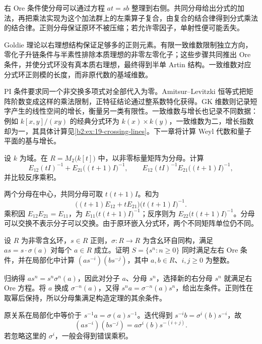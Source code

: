 




\begin{chaptersummary}
	右 Ore 条件使分母可以通过方程 \(at=sb\) 整理到右侧。共同分母给出分式的加法，再把乘法实现为这个加法群上的左乘算子复合，由复合的结合律得到分式乘法的结合律。正则分母保证原环不被压缩；若允许零因子，单射性便可能丢失。

	\ProseParagraphBreak
	Goldie 理论以右理想结构保证足够多的正则元素。有限一致维数限制独立方向，零化子升链条件与半素性排除本质理想的非零左零化子；这些步骤共同推出 Ore 条件，并使分式环没有真本质右理想，最终得到半单 Artin 结构。一致维数对应分式环正则模的长度，而非原代数的基域维数。

	\ProseParagraphBreak
	PI 条件要求同一个非交换多项式对全部代入为零。Amitsur–Levitzki 恒等式把矩阵阶数变成这样的乘法限制，正特征结论通过整系数特化获得。GK 维数则记录短字产生的线性空间的增长，衡量另一类有限性。一致维数与增长也记录不同数据：例如 \(k[x,y]/(xy)\) 的经典分式环为 \(k(x)\times k(y)\)，一致维数为二，增长指数却为一，其具体计算见\cref{b2:ex:19-crossing-lines}。下一章将计算 Weyl 代数和量子平面的基与增长。
\end{chaptersummary}

\BookExercises

\begin{optionalexercise}\label{b2:ex:19-central-matrix-fractions}
	设 \(k\) 为域。在 \(R=M_2\bigl(k[t]\bigr)\) 中，以非零标量矩阵为分母。计算
	\[
		E_{12}(tI)^{-1}+E_{21}\bigl((t+1)I\bigr)^{-1},\qquad E_{12}(tI)^{-1}E_{21}\bigl((t+1)I\bigr)^{-1},
	\]
	并比较反序乘积。
\end{optionalexercise}
\begin{solution}
	两个分母在中心，共同分母可取 \(t(t+1)I\)。和为
	\[
		\bigl((t+1)E_{12}+tE_{21}\bigr)\bigl(t(t+1)I\bigr)^{-1}.
	\]
	乘积因 \(E_{12}E_{21}=E_{11}\)，为 \(E_{11}\bigl(t(t+1)I\bigr)^{-1}\)；反序则为 \(E_{22}\bigl(t(t+1)I\bigr)^{-1}\)。分母可以交换不表示分子可以交换。由于原环嵌入分式环，两个不同矩阵单位仍不同。
\end{solution}

\begin{optionalexercise}\label{b2:ex:19-normal-element-ore}
	设 \(R\) 为非零含幺环，\(s\in R\) 正则，\(\sigma:R\to R\) 为含幺环自同构，满足 \(as=s\cdot\sigma(a)\) 对每个 \(a\in R\) 成立。证明 \(S=\{s^n:n\ge0\}\) 同时满足左右 Ore 条件，并在局部化中计算 \((as^{-i})(bs^{-j})\)，其中 \(a,b\in R\)、\(i,j\ge0\) 为整数。
\end{optionalexercise}
\begin{solution}
	归纳得 \(as^n=s^n\sigma^n(a)\)，因此对分子 \(a\)、分母 \(s^n\)，选择新的右分母 \(s^n\) 就满足右 Ore 方程。将 \(a\) 换成 \(\sigma^{-n}(a)\)，又得 \(s^na=\sigma^{-n}(a)s^n\)，给出左条件。正则性在取幂后保持，所以分母集满足构造定理的其余条件。

	原关系在局部化中等价于 \(s^{-1}a=\sigma(a)s^{-1}\)。迭代得到 \(s^{-i}b=\sigma^i(b)s^{-i}\)，故
	\[
		(as^{-i})(bs^{-j})=a\sigma^i(b)s^{-(i+j)}.
	\]
	若忽略这里的 \(\sigma^i\)，一般会得到错误乘积。
\end{solution}

